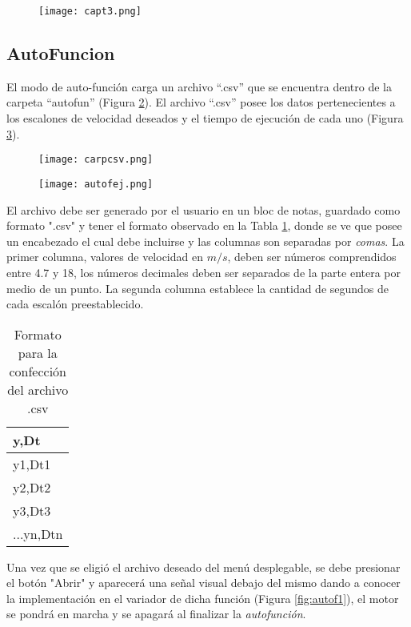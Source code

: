 \begin{figure}[H]
	\centering
	\texttt{[image: capt3.png]}
	\label{fig:capt3}
\end{figure}

\subsection{AutoFuncion}
El modo de auto-función carga un archivo “.csv” que se encuentra dentro de la carpeta “autofun” (Figura \ref{fig:autof2}). El archivo “.csv” posee los datos pertenecientes a los escalones de velocidad deseados y el tiempo de ejecución de cada uno (Figura \ref{fig:autof22}).

\begin{figure}[H]
	\centering
	\texttt{[image: carpcsv.png]}
	\label{fig:autof2}
\end{figure}

\begin{figure}[H]
	\centering
	\texttt{[image: autofej.png]}
	\label{fig:autof22}
\end{figure}

El archivo debe ser generado por el usuario en un bloc de notas, guardado como formato ".csv{}" y tener el formato observado en la Tabla \ref{tab:formcsv}, donde se ve que posee un encabezado el cual debe incluirse y las columnas son separadas por \textit{comas}. La primer columna, valores de velocidad en $m/s$, deben ser números comprendidos entre 4.7 y 18, los números decimales deben ser separados de la parte entera por medio de un punto. La segunda columna establece la cantidad de segundos de cada escalón preestablecido.
\begin{table}[h]
	\centering
	\begin{tabular}{|l|}
		\hline
		y,Dt \\ \hline
		y1,Dt1 \\ \hline
		y2,Dt2 \\ \hline
		y3,Dt3 \\ \hline
		...yn,Dtn \\ \hline
	\end{tabular}
	
	\caption{Formato para la confección del archivo .csv}
	\label{tab:formcsv}
\end{table}


Una vez que se eligió el archivo deseado del menú desplegable, se debe presionar el botón "Abrir" y aparecerá una señal visual debajo del mismo dando a conocer la implementación en el variador de dicha función (Figura \ref{fig:autof1}), el motor se pondrá en marcha y se apagará al finalizar la \textit{autofunción}.

